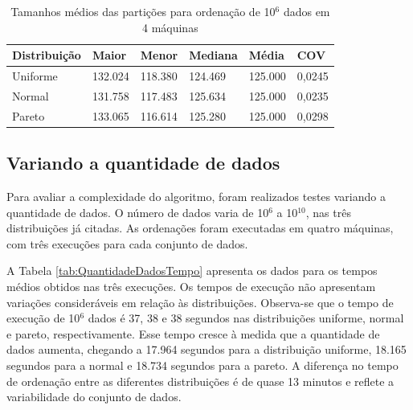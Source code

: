 \begin{table}[!htbp]
\centering
\begin{footnotesize}
\begin{tabular}{|N{24mm}|C{20mm}|C{20mm}|C{20mm}|C{20mm}|C{15mm}|	} \hline
Distribuição	&	Maior	&	Menor	&	Mediana	&	Média	&	COV	\\ \hline \hline
Uniforme	&		132.024	&	118.380	&	124.469	&	125.000	&	0,0245	\\ \hline
Normal	&		131.758	&	117.483	&	125.634	&	125.000	&	0,0235	\\ \hline
Pareto	&		133.065	&	116.614	&	125.280	&	125.000	&	0,0298	\\ \hline
\end{tabular}
\end{footnotesize}
\caption{Tamanhos médios das partições para ordenação de 10$^6$ dados em 4 máquinas}
\label{tab:ConjuntoParticoes}
\end{table}





\subsection{Variando a quantidade de dados}

Para avaliar a complexidade do algoritmo, foram realizados testes variando a quantidade de dados. O número de dados varia de 10$^6$ a 10$^{10}$, nas três distribuições já citadas. As ordenações foram executadas em quatro máquinas, com três execuções para cada conjunto de dados. 

A Tabela \ref{tab:QuantidadeDadosTempo} apresenta os dados para os tempos médios obtidos nas três execuções. Os tempos de execução não apresentam variações consideráveis em relação às distribuições. Observa-se que o tempo de execução de 10$^6$ dados é 37, 38 e 38 segundos nas distribuições uniforme, normal e pareto, respectivamente. Esse tempo cresce à medida que a quantidade de dados aumenta, chegando a 17.964 segundos para a distribuição uniforme, 18.165 segundos para a normal e 18.734 segundos para a pareto. A diferença no tempo de ordenação entre as diferentes distribuições é de quase 13 minutos e reflete a variabilidade do conjunto de dados. %

